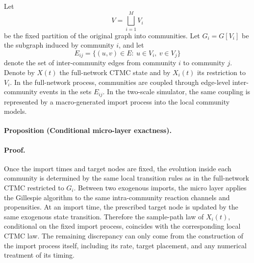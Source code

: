 \documentclass[a4paper,fleqn]{cas-sc}
\begin{document}
Let
\[
V=\bigsqcup_{i=1}^{M}V_i
\]
be the fixed partition of the original graph into communities. Let \(G_i=G[V_i]\) be the subgraph induced by community \(i\), and let
\[
E_{ij}=\{(u,v)\in E:\ u\in V_i,\ v\in V_j\}
\]
denote the set of inter-community edges from community \(i\) to community \(j\). Denote by \(X(t)\) the full-network CTMC state and by \(X_i(t)\) its restriction to \(V_i\). In the full-network process, communities are coupled through edge-level inter-community events in the sets \(E_{ij}\). In the two-scale simulator, the same coupling is represented by a macro-generated import process into the local community models.

\paragraph{Proposition (Conditional micro-layer exactness).}

\paragraph{Proof.}
Once the import times and target nodes are fixed, the evolution inside each community is determined by the same local transition rules as in the full-network CTMC restricted to \(G_i\). Between two exogenous imports, the micro layer applies the Gillespie algorithm to the same intra-community reaction channels and propensities. At an import time, the prescribed target node is updated by the same exogenous state transition. Therefore the sample-path law of \(X_i(t)\), conditional on the fixed import process, coincides with the corresponding local CTMC law. The remaining discrepancy can only come from the construction of the import process itself, including its rate, target placement, and any numerical treatment of its timing.
\end{document}
